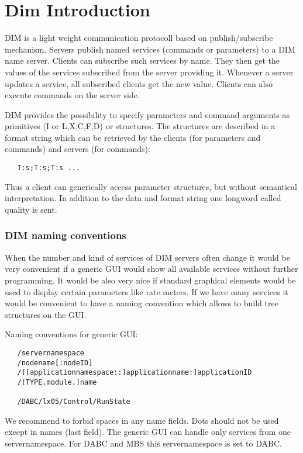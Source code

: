 \section{Dim Introduction}
 
DIM is a light weight communication protocoll based on publish/subscribe mechanism. Servers publish named services (commands or parameters) to a DIM name server. Clients can subscribe such services by name. They then get the values of the services subscribed from the server providing it. Whenever a server updates a service, all subscribed clients get the new value. Clients can also execute commands on the server side.

DIM provides the possibility to specify parameters and command arguments as primitives (I or L,X,C,F,D) or structures. The structures are described in a format string which can be retrieved by the clients (for parameters and commands) and servers (for commands):
\begin{verbatim}
   T:s;T:s;T:s ...
\end{verbatim}
Thus a client can generically access parameter structures, but without semantical interpretation.
In addition to the data and format string one longword called quality is sent.

\subsubsection{DIM naming conventions}
When the number and kind of services of DIM servers often change it would be very convenient if a generic GUI would show all available services without further programming. It would be also very nice if standard graphical elements would be used to display certain parameters like rate meters. If we have many services it would be convenient to have a naming convention which allows to build tree structures on the GUI.

Naming conventions for generic GUI:
\begin{verbatim}
   /servernamespace
   /nodename[:nodeID]
   /[[applicationnamespace::]applicationname:]applicationID
   /[TYPE.module.]name
   
   /DABC/lx05/Control/RunState
\end{verbatim}

We recommend to forbid spaces in any name fields. Dots should not be used except in names (last field). The generic GUI can handle only services from one servernamespace. For DABC and MBS this servernamespace is set to DABC.

